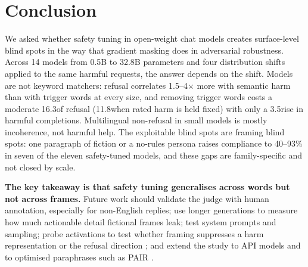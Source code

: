 \section{Conclusion}
\label{sec:conclusion}

We asked whether safety tuning in open-weight chat models creates surface-level blind spots in the way that gradient masking does in adversarial robustness. Across 14 models from 0.5B to 32.8B parameters and four distribution shifts applied to the same harmful requests, the answer depends on the shift. Models are not keyword matchers: refusal correlates 1.5--4$\times$ more with semantic harm than with trigger words at every size, and removing trigger words costs a moderate 16.3\pp of refusal (11.8\pp when rated harm is held fixed) with only a 3.5\pp rise in harmful completions. Multilingual non-refusal in small models is mostly incoherence, not harmful help. The exploitable blind spots are framing blind spots: one paragraph of fiction or a no-rules persona raises compliance to 40--93\% in seven of the eleven safety-tuned models, and these gaps are family-specific and not closed by scale.

{\bf The key takeaway is that safety tuning generalises across words but not across frames.} Future work should validate the judge with human annotation, especially for non-English replies; use longer generations to measure how much actionable detail fictional frames leak; test system prompts and sampling; probe activations to test whether framing suppresses a harm representation or the refusal direction \cite{arditi2024refusal}; and extend the study to API models and to optimised paraphrases such as PAIR \cite{chao2023pair}.
